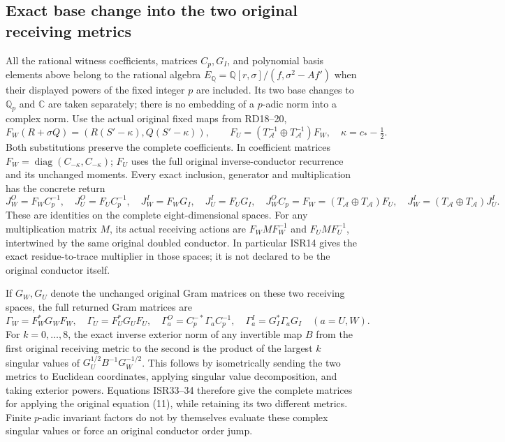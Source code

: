 \documentclass[11pt]{article}
\begin{document}
\subsection{Exact base change into the two original receiving metrics}
All the rational witness coefficients, matrices $C_p,G_I$, and
polynomial basis elements above belong to the rational algebra
$E_{\mathbb Q}=\mathbb Q[r,\sigma]/(f,\sigma^2-Af')$ when their
displayed powers of the fixed integer $p$ are included. Its two
base changes to $\mathbb Q_p$ and $\mathbb C$ are taken separately;
there is no embedding of a $p$-adic norm into a complex norm.
Use the actual original fixed maps from RD18--20,
\begin{equation}
 F_W(R+\sigma Q)=(R(S'-\kappa),Q(S'-\kappa)),\qquad
 F_U=(T_{\mathcal A}^{-1}\oplus T_{\mathcal A}^{-1})F_W,
 \quad \kappa=c_*-\tfrac12.                            \tag{ISR32}
\end{equation}
Both substitutions preserve the complete coefficients. In coefficient
matrices $F_W=\operatorname{diag}(C_{-\kappa},C_{-\kappa})$;
$F_U$ uses the full original inverse-conductor recurrence and its
unchanged moments. Every exact inclusion, generator and multiplication
has the concrete return
\begin{equation}
 J_W^O=F_W C_p^{-1},\quad J_U^O=F_U C_p^{-1},\quad
 J_W^I=F_WG_I,\quad J_U^I=F_UG_I,\quad
 J_W^O C_p=F_W=(T_{\mathcal A}\oplus T_{\mathcal A})F_U,
 \quad J_W^I=(T_{\mathcal A}\oplus T_{\mathcal A})J_U^I.
                                                               \tag{ISR33}
\end{equation}
These are identities on the complete eight-dimensional spaces.
For any multiplication matrix $M$, its actual receiving actions are
$F_WMF_W^{-1}$ and $F_UMF_U^{-1}$, intertwined by the same
original doubled conductor. In particular ISR14 gives the exact
residue-to-trace multiplier in those spaces; it is not declared to
be the original conductor itself.

If $G_W,G_U$ denote the unchanged original Gram matrices on these
two receiving spaces, the full returned Gram matrices are
\begin{equation}
 \Gamma_W=F_W^*G_WF_W,\quad\Gamma_U=F_U^*G_UF_U,\quad
 \Gamma_a^O=C_p^{-*}\Gamma_a C_p^{-1},\quad
 \Gamma_a^I=G_I^*\Gamma_a G_I\quad(a=U,W).               \tag{ISR34}
\end{equation}
For $k=0,\ldots,8$, the exact inverse exterior norm of any invertible
map $B$ from the first original receiving metric to the second is
the product of the largest $k$ singular values of
$G_U^{1/2}B^{-1}G_W^{-1/2}$. This follows by isometrically sending
the two metrics to Euclidean coordinates, applying singular value
decomposition, and taking exterior powers. Equations ISR33--34
therefore give the complete matrices for applying the original
equation (11), while retaining its two different metrics. Finite
$p$-adic invariant factors do not by themselves evaluate these
complex singular values or force an original conductor order jump.
\end{document}
